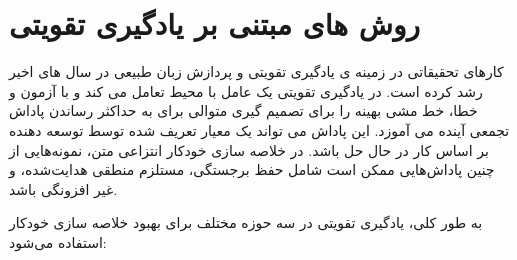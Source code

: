 \chapter{روش های مبتنی بر یادگیری تقویتی}

کارهای تحقیقاتی در زمینه ی یادگیری تقویتی 
و پردازش زبان طبیعی در سال های اخیر رشد کرده است. در یادگیری تقویتی  یک عامل با محیط تعامل می کند و با آزمون و خطا، خط مشی بهینه را برای تصمیم گیری متوالی برای به حداکثر رساندن پاداش تجمعی آینده می آموزد. این پاداش می تواند یک معیار تعریف شده توسط توسعه دهنده بر اساس کار در حال حل باشد. در خلاصه سازی خودکار انتزاعی متن، نمونه‌هایی از چنین پاداش‌هایی ممکن است شامل حفظ برجستگی، مستلزم منطقی هدایت‌شده، و غیر افزونگی باشد. 



به طور کلی،  یادگیری تقویتی  در سه حوزه مختلف برای بهبود خلاصه سازی خودکار استفاده می‌شود:
